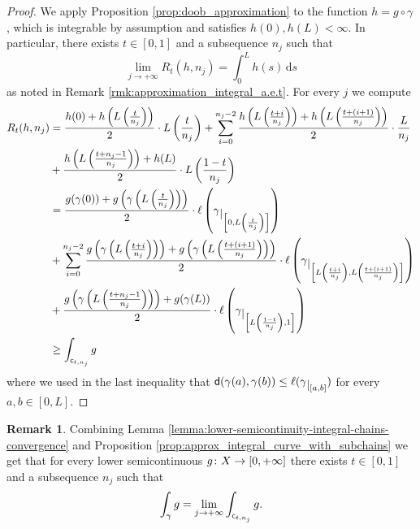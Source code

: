 \documentclass[12pt]{amsart}
\newcommand{\sfd}{{\sf d}}
\renewcommand{\d}{{\mathrm d}}
\newcommand{\restr}[1]{\lower3pt\hbox{$|_{#1}$}}
\newcommand{\X}{{\rm X}}
\theoremstyle{definition}
\newtheorem{remark}[theorem]{Remark}
\newcommand{\sfc}{{\sf c}}
\begin{document}
\begin{proof}
    We apply Proposition \ref{prop:doob_approximation} to the function $h=g \circ \gamma$, which is integrable by assumption and satisfies $h(0),h(L) < \infty$. In particular, there exists $t\in [0,1]$ and a subsequence $n_j$ such that
\begin{equation}
    \lim_{j\to +\infty} R_t(h,n_j) = \int_0^L h(s)\,\d s
\end{equation}
as noted in Remark \ref{rmk:approximation_integral_a.e.t}.
For every $j$ we compute
{\allowdisplaybreaks[4]
\begin{align}
\label{eq:from_time_to_points}
            R_t(h,n_j) &= \frac{h(0) + h\left(L\left(\frac{t}{n_j}\right)\right)}{2} \cdot L\left(\frac{t}{n_j}\right) + \sum_{i=0}^{n_j-2}\frac{h\left(L\left(\frac{t+i}{n_j}\right)\right)+h\left(L\left(\frac{t+(i+1)}{n_j}\right)\right)}{2}\cdot\frac{L}{n_j} \\
            &+ \frac{h\left(L \left(\frac{t+n_j-1}{n_j}\right)\right) + h(L)}{2} \cdot L\left(\frac{1-t}{n_j}\right)\\
            &= \frac{g(\gamma(0)) + g\left(\gamma\left(L\left(\frac{t}{n_j}\right)\right)\right)}{2} \cdot \ell\left(\gamma\restr{\left[0,L\left(\frac{t}{n_j}\right)\right]}\right) \\
            &+ \sum_{i=0}^{n_j-2}\frac{g\left(\gamma\left(L\left(\frac{t+i}{n_j}\right)\right)\right)+g\left(\gamma\left(L\left(\frac{t+(i+1)}{n_j}\right)\right)\right)}{2}\cdot\ell\left(\gamma\restr{\left[ L\left(\frac{t+i}{n_j}\right),L\left(\frac{t+(i+1)}{n_j}\right)\right]}\right) \\
            &+ \frac{g\left(\gamma\left(L \left(\frac{t+n_j-1}{n_j}\right)\right)\right) + g(\gamma(L))}{2} \cdot \ell\left(\gamma\restr{\left[L\left(\frac{1-t}{n_j}\right),1\right]}\right)\\
            &\ge \int_{\sfc_{t,n_j}} g\\
        \end{align}
}
where we used in the last inequality that $\sfd(\gamma(a),\gamma(b))\le \ell(\gamma\restr{[a,b]})$ for every $a,b \in [0,L]$.
\end{proof}

\begin{remark}
    Combining Lemma \ref{lemma:lower-semicontinuity-integral-chains-convergence} and Proposition \ref{prop:approx_integral_curve_with_subchains} we get that for every lower semicontinuous $g\colon \X \to [0,+\infty]$ there exists $t\in [0,1]$ and a subsequence $n_j$ such that
    $$\int_\gamma g = \lim_{j\to +\infty} \int_{\sfc_{t,n_j}}g.$$
\end{remark}
\end{document}
